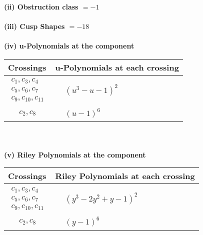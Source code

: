 \documentclass[1p]{elsarticle_modified}
\theoremstyle{definition}
\begin{document}
\flushleft \textbf{(ii) Obstruction class $= -1$}\\~\\
\flushleft \textbf{(iii) Cusp Shapes $= -18$}\\~\\
\newpage\renewcommand{\arraystretch}{1}
\flushleft \textbf{(iv) u-Polynomials at the component}\newline \\
\begin{tabular}{m{50pt}|m{274pt}}
Crossings & \hspace{64pt}u-Polynomials at each crossing \\
\hline $$\begin{aligned}c_{1},c_{3},c_{4}\\c_{5},c_{6},c_{7}\\c_{9},c_{10},c_{11}\end{aligned}$$&$\begin{aligned}
&(u^3- u-1)^2
\end{aligned}$\\
\hline $$\begin{aligned}c_{2},c_{8}\end{aligned}$$&$\begin{aligned}
&(u-1)^6
\end{aligned}$\\
\hline
\end{tabular}\\~\\
\newpage\renewcommand{\arraystretch}{1}
\flushleft \textbf{(v) Riley Polynomials at the component}\newline \\
\begin{tabular}{m{50pt}|m{274pt}}
Crossings & \hspace{64pt}Riley Polynomials at each crossing \\
\hline $$\begin{aligned}c_{1},c_{3},c_{4}\\c_{5},c_{6},c_{7}\\c_{9},c_{10},c_{11}\end{aligned}$$&$\begin{aligned}
&(y^3-2 y^2+y-1)^2
\end{aligned}$\\
\hline $$\begin{aligned}c_{2},c_{8}\end{aligned}$$&$\begin{aligned}
&(y-1)^6
\end{aligned}$\\
\hline
\end{tabular}\\~\\
\end{document}

